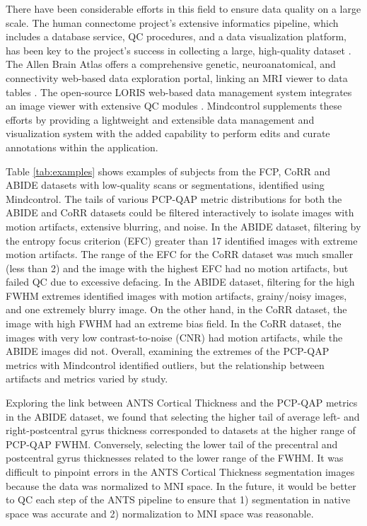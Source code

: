 There have been considerable efforts in this field to ensure data quality on a large scale. The human connectome project's extensive informatics pipeline, which includes a database service, QC procedures, and a data visualization platform, has been key to the project's success in collecting a large, high-quality dataset \cite{Marcus_2013}. The Allen Brain Atlas offers a comprehensive genetic, neuroanatomical, and connectivity web-based data exploration portal, linking an MRI viewer to data tables \cite{Sunkin_2012}. The open-source LORIS web-based data management system integrates an image viewer with extensive QC modules \cite{Das_2012}. Mindcontrol supplements these efforts by providing a lightweight and extensible data management and visualization system with the added capability to perform edits and curate annotations within the application. 

Table \ref{tab:examples} shows examples of subjects from the FCP, CoRR and ABIDE datasets with low-quality scans or segmentations, identified using Mindcontrol. The tails of various PCP-QAP metric distributions for both the ABIDE and CoRR datasets could be filtered interactively to isolate images with motion artifacts, extensive blurring, and noise. In the ABIDE dataset, filtering by the entropy focus criterion (EFC) greater than 17 identified images with extreme motion artifacts. The range of the EFC for the CoRR dataset was much smaller (less than 2) and the image with the highest EFC had no motion artifacts, but failed QC due to excessive defacing. In the ABIDE dataset, filtering for the high FWHM extremes identified images with motion artifacts, grainy/noisy images, and one extremely blurry image. On the other hand, in the CoRR dataset, the image with high FWHM had an extreme bias field. In the CoRR dataset, the images with very low contrast-to-noise (CNR) had motion artifacts, while the ABIDE images did not. Overall, examining the extremes of the PCP-QAP metrics with Mindcontrol identified outliers, but the relationship between artifacts and metrics varied by study.

Exploring the link between ANTS Cortical Thickness and the PCP-QAP metrics in the ABIDE dataset, we found that selecting the higher tail of average left- and right-postcentral gyrus thickness corresponded to datasets at the higher range of PCP-QAP FWHM. Conversely, selecting the lower tail of the precentral and postcentral gyrus thicknesses related to the lower range of the FWHM. It was difficult to pinpoint errors in the ANTS Cortical Thickness segmentation images because the data was normalized to MNI space. In the future, it would be better to QC each step of the ANTS pipeline to ensure that 1) segmentation in native space was accurate and 2) normalization to MNI space was reasonable.

